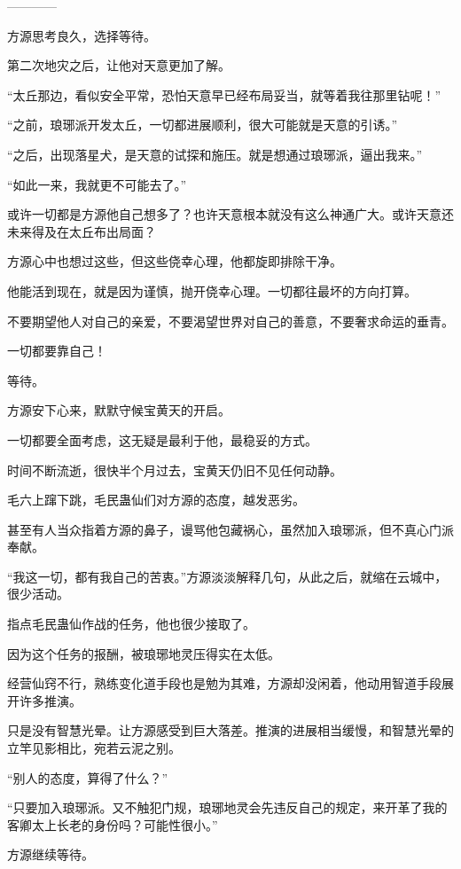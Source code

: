 
\begin{this_body}

------------

方源思考良久，选择等待。

第二次地灾之后，让他对天意更加了解。

“太丘那边，看似安全平常，恐怕天意早已经布局妥当，就等着我往那里钻呢！”

“之前，琅琊派开发太丘，一切都进展顺利，很大可能就是天意的引诱。”

“之后，出现落星犬，是天意的试探和施压。就是想通过琅琊派，逼出我来。”

“如此一来，我就更不可能去了。”

或许一切都是方源他自己想多了？也许天意根本就没有这么神通广大。或许天意还未来得及在太丘布出局面？

方源心中也想过这些，但这些侥幸心理，他都旋即排除干净。

他能活到现在，就是因为谨慎，抛开侥幸心理。一切都往最坏的方向打算。

不要期望他人对自己的亲爱，不要渴望世界对自己的善意，不要奢求命运的垂青。

一切都要靠自己！

等待。

方源安下心来，默默守候宝黄天的开启。

一切都要全面考虑，这无疑是最利于他，最稳妥的方式。

时间不断流逝，很快半个月过去，宝黄天仍旧不见任何动静。

毛六上蹿下跳，毛民蛊仙们对方源的态度，越发恶劣。

甚至有人当众指着方源的鼻子，谩骂他包藏祸心，虽然加入琅琊派，但不真心门派奉献。

“我这一切，都有我自己的苦衷。”方源淡淡解释几句，从此之后，就缩在云城中，很少活动。

指点毛民蛊仙作战的任务，他也很少接取了。

因为这个任务的报酬，被琅琊地灵压得实在太低。

经营仙窍不行，熟练变化道手段也是勉为其难，方源却没闲着，他动用智道手段展开许多推演。

只是没有智慧光晕。让方源感受到巨大落差。推演的进展相当缓慢，和智慧光晕的立竿见影相比，宛若云泥之别。

“别人的态度，算得了什么？”

“只要加入琅琊派。又不触犯门规，琅琊地灵会先违反自己的规定，来开革了我的客卿太上长老的身份吗？可能性很小。”

方源继续等待。


\end{this_body}
